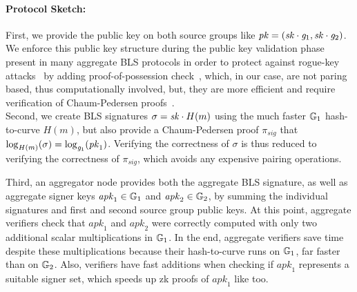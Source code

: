 \paragraph{Protocol Sketch:}
\begin{comment}
We adopt standard notation for pairing friendly curves throughout.


A classical BLS signature places the public key and signature on opposite
curves, but the choice of which creates trade offs. We mitigate these
trade offs:
\end{comment}

First, we provide the public key on both source groups%
like $\mathit{pk} = (\mathit{sk} \cdot \mathit{g}_{1}, \mathit{sk} \cdot \mathit{g}_{2})$.
We enforce this public key structure during the public key validation
phase present in many aggregate BLS protocols in order to protect against rogue-key attacks~\cite{proofs_of_posession}
by adding proof-of-possession check~\cite{proofs_of_posession}, which, in our case, are not paring based, thus computationally involved,  
but, they are more efficient and require verification of Chaum-Pedersen proofs~\cite{ChaumPedersen}. \\

Second, we create BLS signatures $\sigma = \mathit{sk} \cdot H(m)$ using the much
faster $\mathbb{G}_{1}$ hash-to-curve $H(m)$, but also provide a Chaum-Pedersen proof
$\pi_{\mathit{sig}}$ that $\log_{H(m)}(\sigma)= \log_{\mathit{g}_{1}}(\mathit{pk}_1)$.
Verifying the correctness of $\sigma$ is thus reduced to verifying the correctness of $\pi_{\mathit{sig}}$, 
which avoids any expensive pairing operations. \\

\def\apk{\mathit{apk}}

Third, an aggregator node provides both the aggregate BLS signature,
as well as aggregate signer keys $\apk_1 \in \GoneBLS$ and
$\apk_2 \in \GtwoBLS$, by summing the individual signatures and first and second source group public keys.
At this point, aggregate verifiers check that $\apk_1$ and $\apk_2$ were
correctly computed with only two additional scalar multiplications in $\mathbb{G}_{1}$.
In the end, aggregate verifiers save time despite these multiplications
because their hash-to-curve runs on $\mathbb{G}_{1}$, far faster than on $\mathbb{G}_{2}$.
Also, verifiers have fast additions when checking if $\apk_1$ represents
a suitable signer set, which speeds up zk proofs of $\apk_1$ like \cite{ourLC} too. \\

